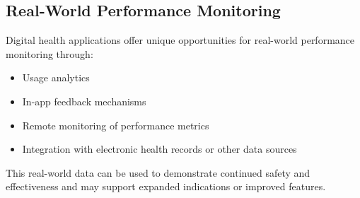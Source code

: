 \subsection{Real-World Performance Monitoring}
Digital health applications offer unique opportunities for real-world performance monitoring through:

\begin{itemize}
    \item Usage analytics
    \item In-app feedback mechanisms
    \item Remote monitoring of performance metrics
    \item Integration with electronic health records or other data sources
\end{itemize}

This real-world data can be used to demonstrate continued safety and effectiveness and may support expanded indications or improved features.